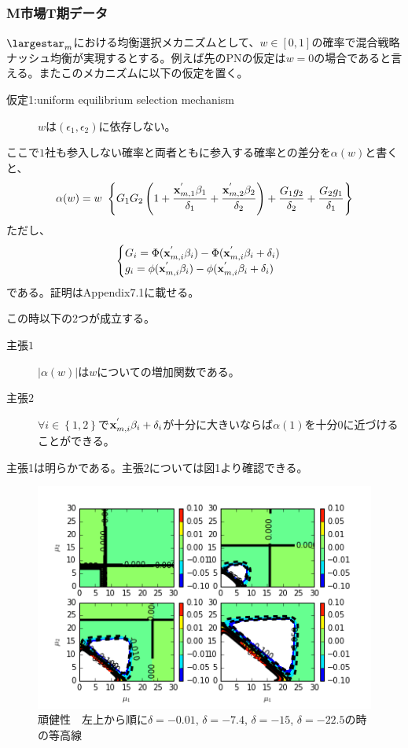 \documentclass{jsarticle}
\begin{document}
\subsubsection{M市場T期データ}
$\largestar_m$における均衡選択メカニズムとして、$w \in [0,1]$の確率で混合戦略ナッシュ均衡が実現するとする。例えば先のPNの仮定は$w = 0$の場合であると言える。またこのメカニズムに以下の仮定を置く。

\begin{description}
\item[仮定1:uniform equilibrium selection mechanism] $w$は$(\epsilon_1, \epsilon_2)$に依存しない。
\end{description}

ここで$1$社も参入しない確率と両者ともに参入する確率との差分を$\alpha(w)$と書くと、
\begin{align*}
	\alpha(w) = w\ \left\{ G_1 G_2 \left( 1 + \frac{{\bf x}_{m, 1}^{'} \beta_1}{\delta_1} + \frac{{\bf x}_{m, 2}^{'} \beta_2}{\delta_2} \right) + \frac{G_1g_2}{\delta_2} + \frac{G_2g_1}{\delta_1} \right\}
\end{align*}
ただし、
\begin{align*}
\begin{cases}
	G_i =  \Phi({\bf x}_{m, i}^{'} \beta_i) - \Phi({\bf x}_{m, i}^{'} \beta_i  + \delta_i)\\
	g_i = \phi({\bf x}_{m, i}^{'} \beta_i) - \phi({\bf x}_{m, i}^{'} \beta_i  + \delta_i)
\end{cases}
\end{align*}
である。証明はAppendix7.1に載せる。

この時以下の2つが成立する。
\begin{description}
	\item[主張$1$] $\left| \alpha(w) \right|$は$w$についての増加関数である。
	\item[主張$2$] $\forall i \in \left\{ 1,2\right\}$で${\bf x}_{m, i}^{'} \beta_i + \delta_i$が十分に大きいならば$\alpha(1)$を十分0に近づけることができる。
\end{description}

主張1は明らかである。主張2については図1より確認できる。

\begin{figure}[t]
\centering
\includegraphics{diff3.png}
\caption{頑健性　左上から順に$\delta = -0.01$, $\delta = -7.4$, $\delta = -15$, $\delta = -22.5$の時の等高線}
\end{figure}
\end{document}

